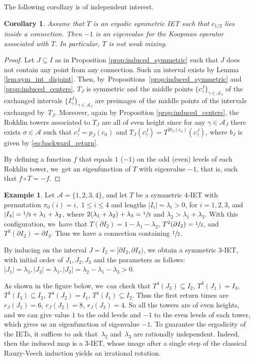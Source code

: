 \documentclass[JEP,XML,SOM,Unicode,NoEqCountersInSection,NoFloatCountersInSection,published]{cedram}
\theoremstyle{plain}
\newtheorem{corollary}[theorem]{Corollary}
\theoremstyle{definition}
\newtheorem{example}[theorem]{Example}
\newcommand{\A}{\mathcal{A}}
\begin{document}
The following corollary is of independent interest.
\begin{corollary}\label{cor: evalue-1}
Assume that $T$ is an ergodic symmetric IET such that $c_{1/2}$ lies inside a connection. Then $-1$ is an eigenvalue for the Koopman operator associated with $T$. In particular, $T$ is not weak mixing.
\end{corollary}

\begin{proof}
Let $J \subseteq I$ as in Proposition \ref{prop:induced_symmetric} such that $J$ does not contain any point from any connection. Such an interval exists by Lemma \ref{lem:sym_int_disjoint}. Then, by~Propo\-si\-tions~\ref{prop:induced_symmetric} and \ref{prop:induced_centers}, $T_J$ is symmetric and the middle points $\{c_\gamma^J\}_{\gamma \in \A_J}$ of the exchanged intervals $\{I_\gamma^J\}_{\gamma \in \A_J}$ are preimages of the middle points of the intervals exchanged by~$T_J$.
Moreover, again by Proposition \ref{prop:induced_centers}, the Rokhlin towers associated to $T_J$ are all of even height since for any $\gamma \in \A_J$ there exists $\sigma \in \A$ such that $c_\gamma^J = p_J(c_\sigma)$ and $T_J(c_\gamma^J) = T^{2b_J(c_\sigma)}(c_\gamma^J)$, where $b_J$ is given by \eqref{eq:backward_return}.

By defining a function $f$ that equals $1$ (\resp $-1$) on the odd (\resp even) levels of each Rokhlin tower, we~get an eigenfunction of $T$ with eigenvalue $-1$, that is, such that $f \circ T = -f$.
\end{proof}

\begin{example}\label{ex:2}
Let $\mathcal{A}=\{1,2,3,4\}$, and let $T$ be a symmetric $4$-IET with permutation $\pi_0(i)=i$,\, $1\le i\le 4$ and lengths $|I_i|=\lambda_i>0$, for $i=1,2,3$, and $|I_4|=\sfrac{1}{2}+\lambda_1+\lambda_2$, where $2(\lambda_1+\lambda_2)+\lambda_3=\sfrac{1}{2}$ and $\lambda_2>\lambda_1+\lambda_3$. With this configuration, we~have that $T(\partial I_2)=1-\lambda_1-\lambda_2$, $T^2(\partial I_2)=\sfrac{1}{2}$, and $T^3(\partial I_2)=\partial I_3$. Thus we have a connection containing $\sfrac{1}{2}$.

By inducing on the interval $J=I_2=[\partial I_2, \partial I_3)$,
we obtain a symmetric 3-IET, with initial order of $J_1, J_2, J_3$
and the parameters as follows: $|J_1|=\lambda_3, |J_2|=\lambda_1,
|J_3|=\lambda_2-\lambda_1-\lambda_3>0$.

As shown in the figure below, we~can check that $T^4(J_3)\subseteq I_2$,
$T^{3}(J_1)=I_3$, \hbox{$T^3(I_3)\subseteq I_2$}, $T^{4}(J_2)=I_1$, $T^4(I_1)\subseteq
I_2$. Thus the first return times are $r_J(J_1)=6$, $r_J(J_2)=8$, $r_J(J_3)=4$.
So all the towers are of even heights, and we can give value $1$ to the
odd levels and $-1$ to the even levels of each tower, which gives us an
eigenfunction of eigenvalue $-1$. To guarantee the ergodicity of the IETs, it
suffices to ask that~$\lambda_2$ and~$\lambda_3$ are rationally
independent. {Indeed, then the induced map is a 3-IET, whose image after a
single step of the classical Rauzy-Veech induction yields an irrational
rotation.}
\end{example}
\end{document}
